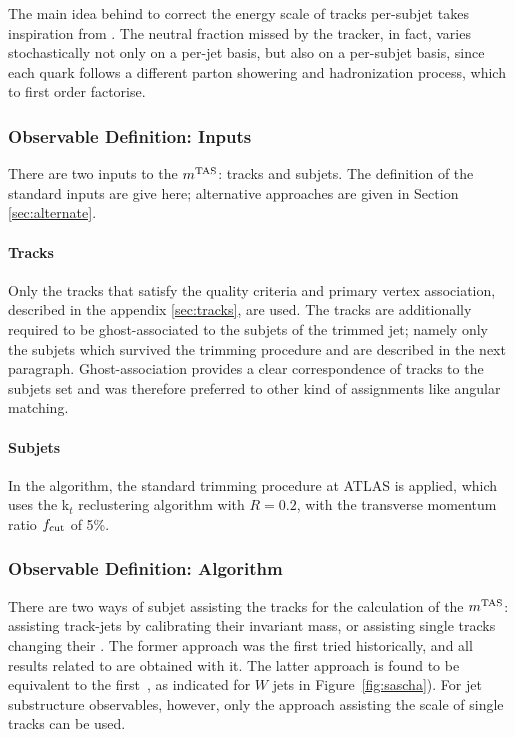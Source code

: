The main idea behind \mtas to correct the energy scale of tracks per-subjet takes inspiration from \mta. The neutral fraction missed by the tracker, in fact, varies stochastically not only on a per-jet basis, but also on a per-subjet basis, since each quark follows a different parton showering and hadronization process, which to first order factorise.


\subsubsection{Observable Definition: Inputs}
\label{sec:tasinputs}
There are two inputs to the $m^\textrm{TAS}$: tracks and subjets. The definition of the standard inputs are give here; alternative approaches are given in Section \ref{sec:alternate}.

\paragraph{Tracks}
Only the tracks that satisfy the quality criteria and primary vertex association, described in the appendix \ref{sec:tracks}, are used.
The tracks are additionally required to be ghost-associated to the subjets of the trimmed jet; namely only the subjets which survived the trimming procedure and are described in the next paragraph.
Ghost-association provides a clear correspondence of tracks to the subjets set and was therefore preferred to other kind of assignments like angular matching.


\paragraph{Subjets}
In the \mtas algorithm, the standard trimming procedure at ATLAS is applied, which uses the k$_t$ reclustering algorithm with $R=0.2$, with the transverse momentum ratio $f_{\rm cut}$ of 5\%.


\subsubsection{Observable Definition: Algorithm}
\label{sec:tasalgo}
\label{sec:tas}
There are two ways of subjet assisting the tracks for the calculation of the $m^\textrm{TAS}$: assisting track-jets by calibrating their invariant mass, or assisting single tracks changing their \pt. The former approach was the first tried historically, and all results related to \mtas are obtained with it. The latter approach is found to be equivalent to the first~\cite{presentation}, as indicated for $W$ jets in Figure~\ref{fig:sascha}). For jet substructure observables, however, only the approach assisting the \pt scale of single tracks can be used.


